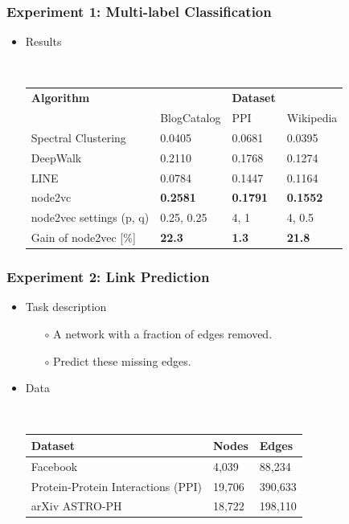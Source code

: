 \documentclass[10pt, aspectratio=169]{beamer}
\begin{document}
\begin{frame}
    \frametitle{Experiment 1: Multi-label Classification}
    \begin{itemize}
        \item Results\par
            ~\\
            \begin{tabular}{llll}
                \toprule
                \textbf{Algorithm} & & \textbf{Dataset} &\\
                             & BlogCatalog & PPI & Wikipedia\\
                \midrule
                Spectral Clustering & 0.0405 & 0.0681 & 0.0395\\
                DeepWalk & 0.2110 & 0.1768 & 0.1274\\
                LINE & 0.0784 & 0.1447 & 0.1164\\
                node2vc & \textbf{0.2581} & \textbf{0.1791} & \textbf{0.1552}\\
                \midrule
                node2vec settings (p, q) & 0.25, 0.25 & 4, 1 & 4, 0.5\\
                Gain of node2vec [\%] & \textbf{22.3} & \textbf{1.3} & \textbf{21.8}\\
                \bottomrule
            \end{tabular}
    \end{itemize}
\end{frame}

\begin{frame}
    \frametitle{Experiment 2: Link Prediction}
    \begin{itemize}
        \item Task description
            \begin{itemize}
                \item[$\circ$] A network with a fraction of edges removed.
                \item[$\circ$] Predict these missing edges.
            \end{itemize}
        \item Data\par
            ~\\
            \begin{tabular}{lll}
                \toprule
                \textbf{Dataset} & \textbf{Nodes} & \textbf{Edges}\\
                \midrule
                Facebook & 4,039 & 88,234 \\
                Protein-Protein Interactions (PPI) & 19,706 & 390,633\\
                arXiv ASTRO-PH & 18,722 & 198,110\\
                \bottomrule
            \end{tabular}
    \end{itemize}
\end{frame}
\end{document}
